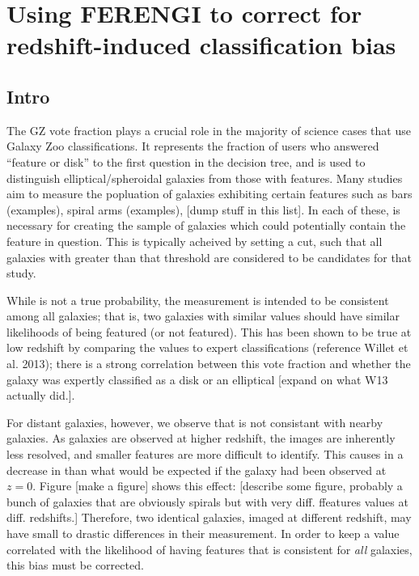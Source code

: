 



\chapter{Using FERENGI to correct \ffeatures{} for redshift-induced classification bias}
\label{chap:ferengi}

\section{Intro}
\label{sec:ferengi_Intro}

The GZ vote fraction \ffeatures{} plays a crucial role in the majority of science cases that use Galaxy Zoo classifications. It represents the fraction of users who answered ``feature or disk'' to the first question in the decision tree, and is used to distinguish elliptical/spheroidal galaxies from those with features. Many studies aim to measure the popluation of galaxies exhibiting certain features such as bars (examples), spiral arms (examples), [dump stuff in this list]. In each of these, \ffeatures{} is necessary for creating the sample of galaxies which could potentially contain the feature in question. This is typically acheived by setting a cut, such that all galaxies with \ffeatures{} greater than that threshold are considered to be candidates for that study.

While \ffeatures{} is not a true probability, the measurement is intended to be consistent among all galaxies; that is, two galaxies with similar \ffeatures{} values should have similar likelihoods of being featured (or not featured). This has been shown to be true at low redshift by comparing the \ffeatures values to expert classifications (reference Willet et al. 2013); there is a strong correlation between this vote fraction and whether the galaxy was expertly classified as a disk or an elliptical [expand on what W13 actually did.].    

For distant galaxies, however, we observe that \ffeatures{} is not consistant with nearby galaxies. As galaxies are observed at higher redshift, the images are inherently less resolved, and smaller features are more difficult to identify. This causes in a decrease in \ffeatures{} than what would be expected if the galaxy had been observed at $z=0$. Figure [make a figure] shows this effect: [describe some figure, probably a bunch of galaxies that are obviously spirals but with very diff. ffeatures values at diff. redshifts.] Therefore, two identical galaxies, imaged at different redshift, may have small to drastic differences in their \ffeatures{} measurement. In order to keep \ffeatures{} a value correlated with the likelihood of having features that is consistent for \emph{all} galaxies, this bias must be corrected. 

